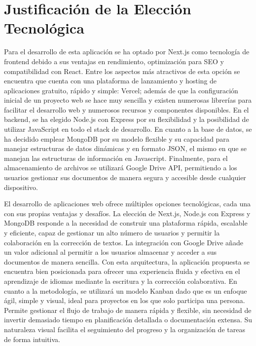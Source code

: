 \section{Justificación de la Elección Tecnológica}
Para el desarrollo de esta aplicación se ha optado por Next.js como tecnología de frontend debido a sus ventajas en rendimiento, optimización para SEO y compatibilidad con React. Entre los aspectos más atractivos de esta opción se encuentra que cuenta con una plataforma de lanzamiento y hosting de aplicaciones gratuito, rápido y simple: Vercel; además de que la configuración inicial de un proyecto web se hace muy sencilla y existen numerosas librerías para facilitar el desarrollo web y numerosos recursos y componentes disponibles.
En el backend, se ha elegido Node.js con Express por su flexibilidad y la posibilidad de utilizar JavaScript en todo el stack de desarrollo. En cuanto a la base de datos, se ha decidido emplear MongoDB por su modelo flexible y su capacidad para manejar estructuras de datos dinámicas y en formato JSON, el mismo en que se manejan las estructuras de información en Javascript.
Finalmente, para el almacenamiento de archivos se utilizará Google Drive API, permitiendo a los usuarios gestionar sus documentos de manera segura y accesible desde cualquier dispositivo.

El desarrollo de aplicaciones web ofrece múltiples opciones tecnológicas, cada una con sus propias ventajas y desafíos. La elección de Next.js, Node.js con Express y MongoDB responde a la necesidad de construir una plataforma rápida, escalable y eficiente, capaz de gestionar un alto número de usuarios y permitir la colaboración en la corrección de textos. La integración con Google Drive añade un valor adicional al permitir a los usuarios almacenar y acceder a sus documentos de manera sencilla. Con esta arquitectura, la aplicación propuesta se encuentra bien posicionada para ofrecer una experiencia fluida y efectiva en el aprendizaje de idiomas mediante la escritura y la corrección colaborativa.
En cuanto a la metodología, se utilizará un modelo Kanban dado que es un enfoque ágil, simple y visual, ideal para proyectos en los que solo participa una persona. Permite gestionar el flujo de trabajo de manera rápida y flexible, sin necesidad de invertir demasiado tiempo en planificación detallada o documentación extensa. Su naturaleza visual facilita el seguimiento del progreso y la organización de tareas de forma intuitiva.
